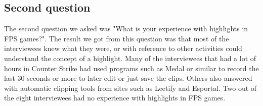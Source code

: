 \subsection{Second question}
The second question we asked was "What is your experience with highlights in FPS games?". The result we got from this question was that most of the interviewees knew what they were, or with reference to other activities could understand the concept of a highlight. Many of the interviewees that had a lot of hours in Counter Strike had used programs such as Medal or similar to record the last 30 seconds or more to later edit or just save the clips. Others also answered with automatic clipping tools from sites such as Leetify and Esportal. Two out of the eight interviewees had no experience with highlights in FPS games.\\\\
